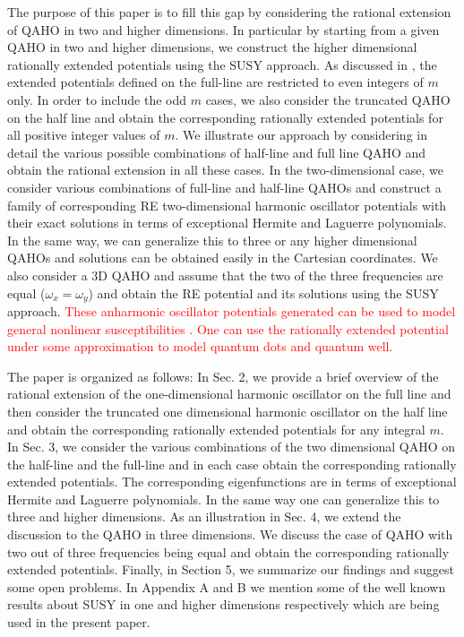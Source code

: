 \documentclass[12pt]{article}
\numberwithin{equation}{section} %
\begin{document}
The purpose of this paper is to fill this gap by considering the rational extension of QAHO in two and higher dimensions. In particular by starting from a given QAHO in two and higher dimensions, we construct the higher dimensional rationally extended potentials using the SUSY approach. As discussed in \cite{marquette2013two}, the extended potentials defined on the full-line are restricted to even integers of \(m\) only. In order to include the odd \(m\) cases, we also consider the truncated QAHO on the half line and obtain the corresponding rationally extended potentials for all positive integer values of \(m\). We illustrate our approach by considering in detail the various possible combinations of half-line and full line QAHO and obtain the rational extension in all these cases.
In the two-dimensional case, we consider various combinations of full-line and half-line QAHOs and construct a family of corresponding RE two-dimensional harmonic oscillator potentials with their exact solutions in terms of exceptional Hermite and Laguerre polynomials. In the same way, we can generalize this to three or any higher dimensional QAHOs and solutions can be obtained easily in the Cartesian coordinates. We also consider a 3D QAHO and assume that the two of the three frequencies are equal (\(\omega_x=\omega_y\)) and obtain the RE potential and its solutions using the SUSY approach. \textcolor{red}{These anharmonic oscillator potentials generated can be used to model general nonlinear susceptibilities \cite{garrett2003nonlinear}. One can use the rationally extended potential under some approximation to model quantum dots and quantum well. }

The paper is organized as follows: In Sec. 2, we provide a brief overview of the rational extension of the one-dimensional harmonic oscillator on the full line and then consider the truncated one dimensional harmonic oscillator on the half line and obtain the corresponding rationally extended potentials for any integral \(m\). In Sec. 3, we consider the various combinations of the two dimensional QAHO on the half-line and the full-line and in each case obtain the corresponding rationally extended potentials. The corresponding eigenfunctions are in terms of exceptional Hermite and Laguerre polynomials. In the same way one can generalize this to three and higher dimensions. As an illustration in Sec. 4, we extend the discussion to the QAHO in three dimensions. We discuss the case of QAHO with two out of three frequencies being equal and obtain the corresponding rationally extended potentials. Finally, in Section 5, we summarize our findings and suggest some open problems. In Appendix A and B we mention some of the well known results about SUSY in one and higher dimensions respectively which are being used in the present paper. 
\end{document}
